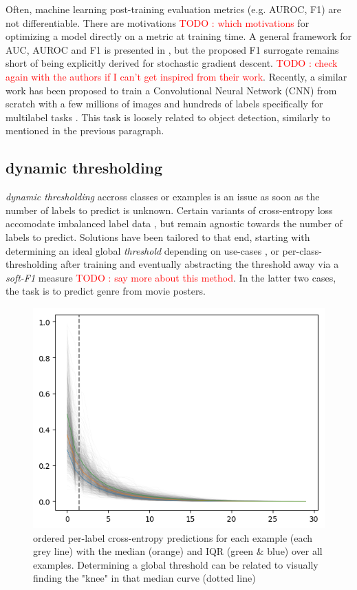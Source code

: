 \documentclass[sigconf,natbib,screen=true,review=true,anonymous]{acmart}
\newcommand\todo[1]{\textcolor{red}{TODO : #1}}
\begin{document}
Often, machine learning post-training evaluation metrics (e.g. AUROC, F1) are not differentiable. There are motivations \todo{which motivations} for optimizing a model directly on a metric at training time. A general framework for AUC, AUROC and F1 is presented in \cite{optimizableLosses}, but the proposed F1 surrogate remains short of being explicitly derived for stochastic gradient descent. \todo{check again with the authors if I can't get inspired from their work}. Recently, a similar work has been proposed to train a Convolutional Neural Network (CNN) from scratch with a few millions of images and hundreds of labels specifically for multilabel tasks \cite{tencent}. This task is loosely related to object detection, similarly to \cite{multitaskLabelImages} mentioned in the previous paragraph.



\subsection{dynamic thresholding}
\label{sec:orgf833f75}

\emph{dynamic thresholding} accross classes or examples is an issue as soon as the number of labels to predict is unknown. Certain variants of cross-entropy loss accomodate imbalanced label data  \cite{focalLoss}, but remain agnostic towards the number of labels to predict. Solutions have been tailored to that end, starting with determining an ideal global \emph{threshold} depending on use-cases \cite{threshForF1}, or per-class-thresholding after training \cite{moviePosters} and eventually abstracting the threshold away via a \emph{soft-F1} measure \cite{softF1} \todo{say more about this method}. In the latter two cases, the task is to predict genre from movie posters.

\begin{figure}[htbp]
\centering
\includegraphics[width=.9\linewidth]{./images/knee.png}
\caption{\label{fig:knee}
ordered per-label cross-entropy predictions for each example (each grey line) with the median (orange) and IQR (green \& blue) over all examples. Determining a global threshold can be related to visually finding the "knee" in that median curve (dotted line)}
\end{figure}
\end{document}
